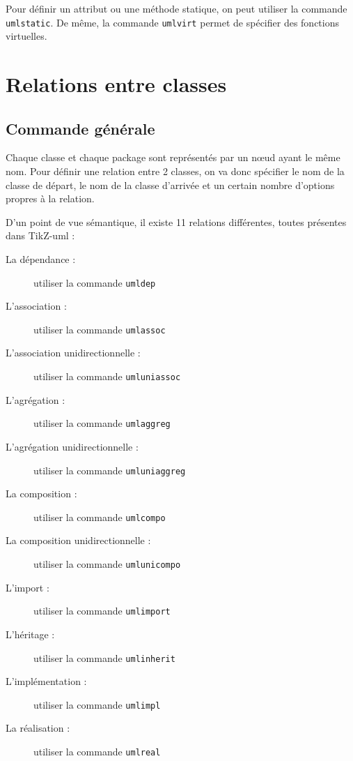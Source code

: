 \documentclass[a4paper,11pt]{report}
\newcommand{\inputTikZ}[1]{%
  }%
\newcommand{\inputTikZ}[1]{%
    \texttt{[image: fig/\#1.pdf]}%
  }%
\newcommand{\tuml}{{\sc TikZ-uml}}
\begin{document}
\medskip

Pour définir un attribut ou une méthode statique, on peut utiliser la commande {\tt umlstatic}. De même, la commande {\tt umlvirt} permet de spécifier des fonctions virtuelles.

\section{Relations entre classes}\label{s.rel}

\subsection{Commande générale}\label{ss.relgen}

Chaque classe et chaque package sont représentés par un n\oe{}ud ayant le même nom. Pour définir une relation entre 2 classes, on va donc spécifier le nom de la classe de départ, le nom de la classe d'arrivée et un certain nombre d'options propres à la relation.

\medskip

\begin{minipage}{0.5\textwidth}

\end{minipage}
\begin{minipage}{0.4\textwidth}
\begin{center}
\inputTikZ{relation}
\end{center}
\end{minipage}

D'un point de vue sémantique, il existe 11 relations différentes, toutes présentes dans \tuml{} :

\begin{description}
\item[La dépendance :] utiliser la commande {\tt umldep}
\item[L'association :] utiliser la commande {\tt umlassoc}
\item[L'association unidirectionnelle :] utiliser la commande {\tt umluniassoc}
\item[L'agrégation :] utiliser la commande {\tt umlaggreg}
\item[L'agrégation unidirectionnelle :] utiliser la commande {\tt umluniaggreg}
\item[La composition :] utiliser la commande {\tt umlcompo}
\item[La composition unidirectionnelle :] utiliser la commande {\tt umlunicompo}
\item[L'import :] utiliser la commande {\tt umlimport}
\item[L'héritage :] utiliser la commande {\tt umlinherit}
\item[L'implémentation :] utiliser la commande {\tt umlimpl}
\item[La réalisation :] utiliser la commande {\tt umlreal}
\end{description}
\end{document}
